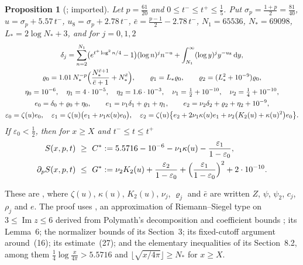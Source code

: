 \documentclass[11pt]{article}
\newtheorem{proposition}[theorem]{Proposition}
\theoremstyle{definition}
\theoremstyle{remark}
\newcommand{\dd}{\,\mathrm d}
\newcommand{\im}{\operatorname{Im}}
\numberwithin{equation}{section}
\begin{document}
\begin{proposition}[{\cite[Proposition~11]{hb}}; imported]\label{prop:hb11}
Let $p=\frac{61}{20}$ and $0\le t^-\le t^+\le\frac15$. Put
$\sigma_p=\frac{1+p}2=\frac{81}{40}$, $u=\sigma_p+5.57\,t^-$,
$u_8=\sigma_p+2.78\,t^-$, $\bar e=\frac{p-1}2-2.78\,t^-$, $N_1=65536$,
$N_*=69098$, $L_*=2\log N_*+3$, and for $j=0,1,2$
\begin{gather*}
\delta_j=\sum_{n=2}^{N_1}\bigl(e^{t^+\log^2n/4}-1\bigr)(\log n)^jn^{-u}+\int_{N_1}^\infty(\log y)^jy^{-u_8}\dd y,\\
\varrho_0=1.01\,N_*^{-p}\Bigl(\frac{N_*^{\bar e+1}}{\bar e+1}+N_*^{\bar e}\Bigr),\qquad\varrho_1=L_*\varrho_0,\qquad\varrho_2=(L_*^2+10^{-9})\varrho_0,\\
\eta_0=10^{-6},\quad\eta_1=4\cdot10^{-5},\quad\eta_2=1.6\cdot10^{-3},\quad\nu_1=\tfrac12+10^{-10},\quad\nu_2=\tfrac14+10^{-10},\\
e_0=\delta_0+\varrho_0+\eta_0,\qquad e_1=\nu_1\delta_1+\varrho_1+\eta_1,\qquad e_2=\nu_2\delta_2+\varrho_2+\eta_2+10^{-9},\\
\varepsilon_0=\zeta(u)e_0,\quad\varepsilon_1=\zeta(u)\bigl(e_1+\nu_1\kappa(u)e_0\bigr),\quad
\varepsilon_2=\zeta(u)\bigl\{e_2+2\nu_1\kappa(u)e_1+\nu_2\bigl(K_2(u)+\kappa(u)^2\bigr)e_0\bigr\}.
\end{gather*}
If $\varepsilon_0<\frac12$, then for $x\ge X$ and $t^-\le t\le t^+$
\begin{align*}
S(x,p,t)&\ \ge\ C^*:=5.5716-10^{-6}-\nu_1\kappa(u)-\frac{\varepsilon_1}{1-\varepsilon_0},\\
\partial_pS(x,p,t)&\ \le\ G^*:=\nu_2K_2(u)+\frac{\varepsilon_2}{1-\varepsilon_0}+\Bigl(\frac{\varepsilon_1}{1-\varepsilon_0}\Bigr)^2+2\cdot10^{-10}.
\end{align*}
\end{proposition}

These are \cite[(28)--(32)]{hb}, where $\zeta(u)$, $\kappa(u)$, $K_2(u)$,
$\nu_j$, $\varrho_j$ and $\bar e$ are written $Z$, $\psi$, $\psi_2$, $c_j$,
$\rho_j$ and $e$. The proof uses \cite[Lemma~3]{hb}, an approximation of
Riemann--Siegel type on $3\le\im z\le6$ derived from Polymath's
decomposition \cite[(37)--(41)]{polymath} and coefficient bounds
\cite[Propositions~6.1--6.2]{polymath}; its Lemma~6; the normalizer bounds
of its Section~3; its fixed-cutoff argument around~(16); its
estimate~(27); and the elementary inequalities of its Section~8.2, among
them $\frac14\log\frac x{4\pi}>5.5716$ and
$\lfloor\sqrt{x/4\pi}\rfloor\ge N_*$ for $x\ge X$.
\end{document}
